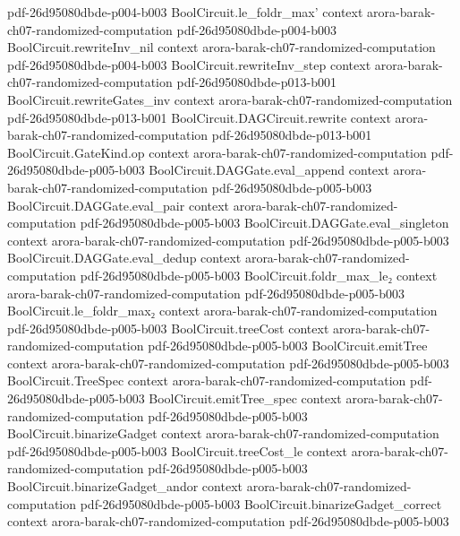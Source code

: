 \begin{theorem}
  {pdf-26d95080dbde-p004-b003}
\proofstep
  {BoolCircuit.le_foldr_max'}
  {context}
  {arora-barak-ch07-randomized-computation}
  {pdf-26d95080dbde-p004-b003}
\proofstep
  {BoolCircuit.rewriteInv_nil}
  {context}
  {arora-barak-ch07-randomized-computation}
  {pdf-26d95080dbde-p004-b003}
\proofstep
  {BoolCircuit.rewriteInv_step}
  {context}
  {arora-barak-ch07-randomized-computation}
  {pdf-26d95080dbde-p013-b001}
\proofstep
  {BoolCircuit.rewriteGates_inv}
  {context}
  {arora-barak-ch07-randomized-computation}
  {pdf-26d95080dbde-p013-b001}
\proofstep
  {BoolCircuit.DAGCircuit.rewrite}
  {context}
  {arora-barak-ch07-randomized-computation}
  {pdf-26d95080dbde-p013-b001}
\proofstep
  {BoolCircuit.GateKind.op}
  {context}
  {arora-barak-ch07-randomized-computation}
  {pdf-26d95080dbde-p005-b003}
\proofstep
  {BoolCircuit.DAGGate.eval_append}
  {context}
  {arora-barak-ch07-randomized-computation}
  {pdf-26d95080dbde-p005-b003}
\proofstep
  {BoolCircuit.DAGGate.eval_pair}
  {context}
  {arora-barak-ch07-randomized-computation}
  {pdf-26d95080dbde-p005-b003}
\proofstep
  {BoolCircuit.DAGGate.eval_singleton}
  {context}
  {arora-barak-ch07-randomized-computation}
  {pdf-26d95080dbde-p005-b003}
\proofstep
  {BoolCircuit.DAGGate.eval_dedup}
  {context}
  {arora-barak-ch07-randomized-computation}
  {pdf-26d95080dbde-p005-b003}
\proofstep
  {BoolCircuit.foldr_max_le₂}
  {context}
  {arora-barak-ch07-randomized-computation}
  {pdf-26d95080dbde-p005-b003}
\proofstep
  {BoolCircuit.le_foldr_max₂}
  {context}
  {arora-barak-ch07-randomized-computation}
  {pdf-26d95080dbde-p005-b003}
\proofstep
  {BoolCircuit.treeCost}
  {context}
  {arora-barak-ch07-randomized-computation}
  {pdf-26d95080dbde-p005-b003}
\proofstep
  {BoolCircuit.emitTree}
  {context}
  {arora-barak-ch07-randomized-computation}
  {pdf-26d95080dbde-p005-b003}
\proofstep
  {BoolCircuit.TreeSpec}
  {context}
  {arora-barak-ch07-randomized-computation}
  {pdf-26d95080dbde-p005-b003}
\proofstep
  {BoolCircuit.emitTree_spec}
  {context}
  {arora-barak-ch07-randomized-computation}
  {pdf-26d95080dbde-p005-b003}
\proofstep
  {BoolCircuit.binarizeGadget}
  {context}
  {arora-barak-ch07-randomized-computation}
  {pdf-26d95080dbde-p005-b003}
\proofstep
  {BoolCircuit.treeCost_le}
  {context}
  {arora-barak-ch07-randomized-computation}
  {pdf-26d95080dbde-p005-b003}
\proofstep
  {BoolCircuit.binarizeGadget_andor}
  {context}
  {arora-barak-ch07-randomized-computation}
  {pdf-26d95080dbde-p005-b003}
\proofstep
  {BoolCircuit.binarizeGadget_correct}
  {context}
  {arora-barak-ch07-randomized-computation}
  {pdf-26d95080dbde-p005-b003}

\end{theorem}
